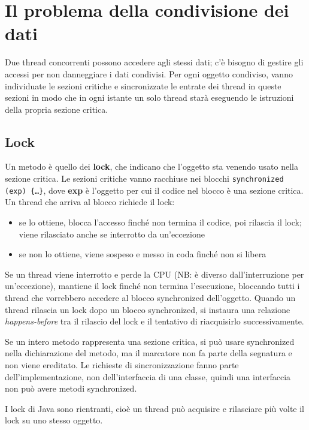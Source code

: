 \section{Il problema della condivisione dei dati}
Due thread concorrenti possono accedere agli stessi dati; c'è bisogno di gestire gli accessi per non danneggiare i dati condivisi. Per ogni oggetto condiviso, vanno individuate le sezioni critiche e sincronizzate le entrate dei thread in queste sezioni in modo che in ogni istante un solo thread starà eseguendo le istruzioni della propria sezione critica.

\subsection{Lock}
Un metodo è quello dei \textbf{lock}, che indicano che l'oggetto sta venendo usato nella sezione critica.
Le sezioni critiche vanno racchiuse nei blocchi \texttt{synchronized (exp) \{…\}}, dove \textbf{exp} è l'oggetto per cui il codice nel blocco è una sezione critica.
Un thread che arriva al blocco richiede il lock:
\begin{itemize}
\item se lo ottiene, blocca l'accesso finché non termina il codice, poi rilascia il lock; viene rilasciato anche se interrotto da un'eccezione
\item se non lo ottiene, viene sospeso e messo in coda finché non si libera
\end{itemize}
Se un thread viene interrotto e perde la CPU (NB: è diverso dall'interruzione per un'eccezione), mantiene il lock finché non termina l'esecuzione, bloccando tutti i thread che vorrebbero accedere al blocco synchronized dell'oggetto.
Quando un thread rilascia un lock dopo un blocco synchronized, si instaura una relazione \textit{happens-before} tra il rilascio del lock e il tentativo di riacquisirlo successivamente. 

Se un intero metodo rappresenta una sezione critica, si può usare synchronized nella dichiarazione del metodo, ma il marcatore non fa parte della segnatura e non viene ereditato. Le richieste di sincronizzazione fanno parte dell'implementazione, non dell'interfaccia di una classe, quindi una interfaccia non può avere metodi synchronized.

I lock di Java sono rientranti, cioè un thread può acquisire e rilasciare più volte il lock su uno stesso oggetto.

